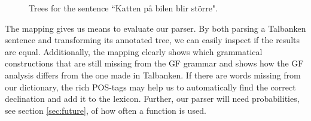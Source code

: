 \documentclass{report}
\begin{document}
\begin{figure}[h]
\hspace{-10mm}
\caption{Trees for the sentence ``Katten på bilen blir större".}
\label{fig:translationtrees}
\end{figure}

The mapping %
gives us means to evaluate our parser. By both parsing a Talbanken sentence and
transforming its annotated tree, we can easily inspect if the results are
equal.
Additionally, the mapping clearly shows which grammatical constructions that are still missing
from the GF grammar and shows how the GF analysis differs from the one made
in Talbanken.
If there are words missing from our dictionary, the rich
POS-tags may help us to automatically find the correct declination and add it to the
lexicon. Further, our parser will need probabilities, see section
\ref{sec:future}, of how often a function is used.\\
\end{document}
